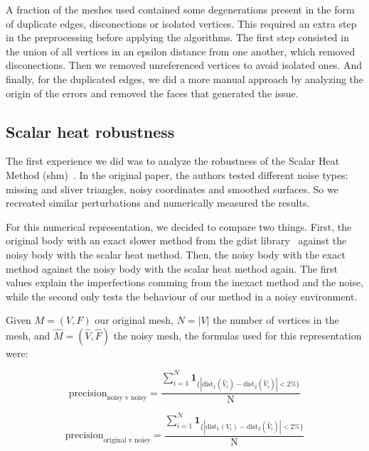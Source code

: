 \documentclass[sigconf, nonacm]{acmart}
\begin{document}
A fraction of the meshes used contained some degenerations present in the form of duplicate edges, disconections or isolated vertices.
This required an extra step in the preprocessing before applying the algorithms. The first step consisted in the union of all vertices in
an epsilon distance from one another, which removed disconections. Then we removed unreferenced vertices to avoid isolated ones. And finally,
for the duplicated edges, we did a more manual approach by analyzing the origin of the errors and removed the faces that generated the issue. 

\subsection{Scalar heat robustness}

The first experience we did was to analyze the robustness of the Scalar Heat Method (shm)~\cite{Crane:2017:HMD}. In
the original paper, the authors tested different noise types: missing and sliver triangles,
noisy coordinates and smoothed surfaces. So we recreated similar perturbations and numerically
measured the results.

For this numerical representation, we decided to compare two things. First, the original body
with an exact slower method from the gdist library~\cite{exact_method_algorithm}\cite{exact_method_library}
against the noisy body with the scalar heat method.
Then, the noisy body with the exact method against the noisy body with the scalar heat method again.
The first values explain the imperfections comming from the inexact method and the noise, while
the second only tests the behaviour of our method in a noisy environment.

Given $M = (V, F)$ our original mesh, $N = |V|$ the number of vertices in the mesh, and $\hat{M} = (\hat{V}, \hat{F})$ the noisy mesh,
the formulas used for this representation were:

\begin{equation} \label{eq:nvn_precision}
  \text{precision}_{\text{noisy v noisy}} = \frac{\sum_{i=1}^N \mathbf{1}_{\{|\text{dist}_1(\hat{V}_i) - \text{dist}_2(\hat{V}_i)| < 2\%\}}}{\text{N}} 
\end{equation}

\begin{equation} \label{eq:ovn_precision}
  \text{precision}_{\text{original v noisy}} = \frac{\sum_{i=1}^N \mathbf{1}_{\{|\text{dist}_1(V_i) - \text{dist}_2(\hat{V}_i)| < 2\%\}}}{\text{N}} 
\end{equation}
\end{document}
